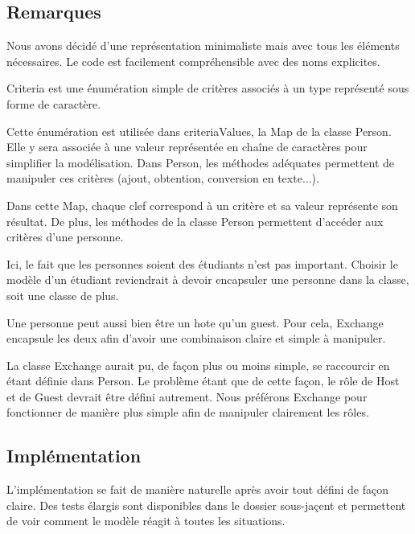 \documentclass{mytex}
\begin{document}
\subsection{Remarques}

Nous avons décidé d'une représentation minimaliste mais avec tous les éléments nécessaires.
Le code est facilement compréhensible avec des noms explicites.


Criteria est une énumération simple de critères associés à un type représenté sous forme de caractère.

Cette énumération est utilisée dans criteriaValues, la Map de la classe Person. Elle y sera associée à une valeur représentée en chaîne de caractères pour simplifier la modélisation. Dans Person, les méthodes adéquates permettent de manipuler ces critères (ajout, obtention, conversion en texte...).

Dans cette Map, chaque clef correspond à un critère et sa valeur représente son résultat. De plus, les méthodes de la classe Person permettent d'accéder aux critères d'une personne.


Ici, le fait que les personnes soient des étudiants n'est pas important.
Choisir le modèle d'un étudiant reviendrait à devoir encapsuler une personne dans la classe, soit une classe de plus.


Une personne peut aussi bien être un hote qu'un guest.
Pour cela, Exchange encapsule les deux afin d'avoir une combinaison claire et simple à manipuler.


La classe Exchange aurait pu, de façon plus ou moins simple, se raccourcir en étant définie dans Person.
Le problème étant que de cette façon, le rôle de Host et de Guest devrait être défini autrement. Nous préférons Exchange pour fonctionner de manière plus simple afin de manipuler clairement les rôles.

\subsection{Implémentation}

L'implémentation se fait de manière naturelle après avoir tout défini de façon claire.
Des tests élargis sont disponibles dans le dossier sous-jaçent et permettent de voir comment le modèle réagit à toutes les situations.
\end{document}
